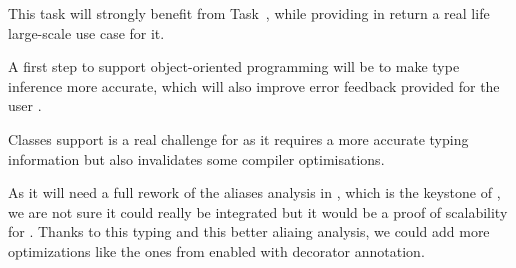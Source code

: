 \begin{workpackage}[id=hpc,wphases=36-48,
  title=High Performance Computing,
  PSRM=1, %
  LLRM=12, %
  SARM=1, %
  UKRM=1, %
  UBRM=1, %
  UJFRM=12]
\begin{tasklist}
\begin{task}[title=\Pythran for \Sage and \Sage Users,id=pythran_sage]
  This task will strongly benefit from Task~,
  while providing in return a real life large-scale use case for it.

  A first step to support object-oriented programming will be to make
  \Pythran type inference more accurate, which will also improve error
  feedback provided for the user .
\end{task}

\begin{task}[title=Explorative task: Add support for classes in \Pythran.]
  Classes support is a real challenge for \Pythran as it requires a more
  accurate typing information but also invalidates some compiler optimisations.

  As it will need a full rework of the aliases analysis in \Pythran, which is
  the keystone of \Pythran, we are not sure it could really
  be integrated but it would be a proof of scalability for \Pythran.
  Thanks to this typing and this better aliaing analysis, we could add more
  optimizations like the ones from \Cython enabled with decorator annotation.
\end{task}
\end{tasklist}


\end{workpackage}
